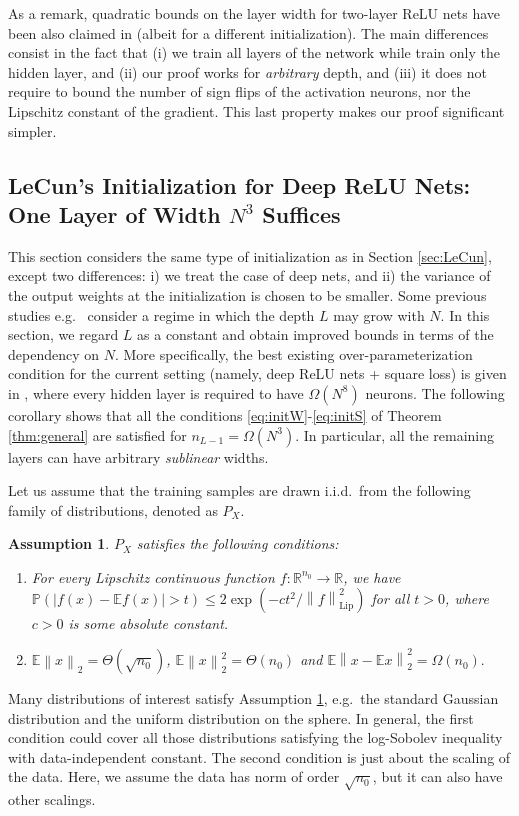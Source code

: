 \documentclass{article}
\def\RR{\mathbb{R}}
\newcommand{\E}{\mathbb{E}}
\newtheorem{assumptions}[theorem]{Assumption}
\newcommand{\bigOmg}[1]{\Omega\left(#1\right)}
\newcommand{\bigexp}[1]{\exp\left(#1\right)}
\newcommand{\norm}[1]{\left\|#1\right\|}
\newcommand{\abs}[1]{\left|#1\right|}
\def\Lip{\mathrm{Lip}}
\def\PP{\mathbb{P}}
\begin{document}
As a remark, quadratic bounds on the layer width for two-layer ReLU nets have been also claimed in \cite{SongYang2020} 
(albeit for a different initialization).
The main differences consist in the fact that (i) we train all layers of the network while \cite{SongYang2020} train only the hidden layer, 
and (ii) our proof works for {\em arbitrary} depth,
and (iii) it does not require to bound the number of sign flips of the activation neurons,
nor the Lipschitz constant of the gradient.
This last property makes our proof significant simpler.

\subsection{LeCun's Initialization for Deep ReLU Nets: One Layer of Width $N^3$ Suffices}\label{sec:LeCun_deep}
This section considers the same type of initialization as in Section \ref{sec:LeCun}, except two differences:
i) we treat the case of deep nets, 
and ii) the variance of the output weights at the initialization is chosen to be smaller. 
Some previous studies e.g.\ \cite{AllenZhuEtal2018, ZouGu2019, ChenCaoZouGu2019} 
consider a regime in which the depth $L$ may grow with $N$.
In this section, we regard $L$ as a constant and obtain improved bounds in terms of the dependency on $N$.
More specifically, the best existing over-parameterization condition for the current setting (namely, deep ReLU nets + square loss) is given in
\cite{ZouGu2019}, where every hidden layer is required to have $\Omega(N^8)$ neurons.
The following corollary shows that all the conditions \eqref{eq:initW}-\eqref{eq:initS} of Theorem \ref{thm:general} are satisfied
for $n_{L-1}=\Omega(N^3)$. 
In particular, all the remaining layers can have arbitrary {\em sublinear} widths.

Let us assume that the training samples are drawn i.i.d.\ from the following family of distributions, denoted as $P_X$.
\begin{assumptions}\label{ass:data_dist}
    $P_X$ satisfies the following conditions:
    \begin{enumerate}
	\item For every Lipschitz continuous function $f:\RR^{n_0}\to\RR$, we have
	$\PP(\abs{f(x)-\E f(x)}>t)\leq 2\bigexp{-ct^2 / \norm{f}_{\Lip}^2}$ for all $t>0$, where $c>0$ is some absolute constant.
	\item $\E\norm{x}_2=\Theta(\sqrt{n_0})$, $\E\norm{x}_2^2=\Theta(n_0)$ and $\E\norm{x-\E x}_2^2=\bigOmg{n_0}.$ 
    \end{enumerate}
\end{assumptions}
Many distributions of interest satisfy Assumption \ref{ass:data_dist}, e.g.\ the standard Gaussian distribution and
the uniform distribution on the sphere.
In general, the first condition could cover
all those distributions satisfying the log-Sobolev inequality with data-independent constant.
The second condition is just about the scaling of the data. 
Here, we assume the data has norm of order $\sqrt{n_0}$, 
but it can also have other scalings.
\end{document}
